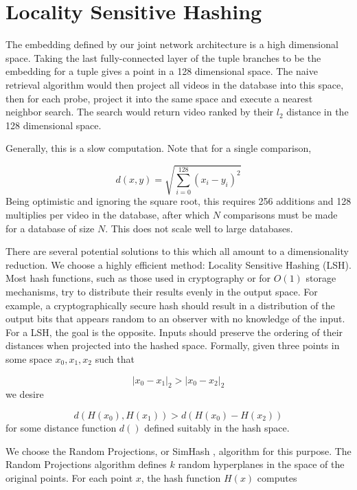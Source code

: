 \section{Locality Sensitive Hashing}\label{sec:hashing}

The embedding defined by our joint network architecture is a high dimensional space. Taking the last fully-connected layer of the tuple branches to be the embedding for a tuple gives a point in a 128 dimensional space. The naive retrieval algorithm would then project all videos in the database into this space, then for each probe, project it into the same space and execute a nearest neighbor search. The search would return video ranked by their $l_2$ distance in the 128 dimensional space.

Generally, this is a slow computation. Note that for a single comparison, 

\begin{equation}
    d(x, y) = \sqrt{\sum_{i=0}^{128} (x_i - y_i)^2}
\end{equation} 
Being optimistic and ignoring the square root, this requires 256 additions and 128 multiplies per video in the database, after which $N$ comparisons must be made for a database of size $N$. This does not scale well to large databases.

There are several potential solutions to this which all amount to a dimensionality reduction. We choose a highly efficient method: Locality Sensitive Hashing (LSH). Most hash functions, such as those used in cryptography or for $O(1)$ storage mechanisms, try to distribute their results evenly in the output space. For example, a cryptographically secure hash should result in a distribution of the output bits that appears random to an observer with no knowledge of the input. For a LSH, the goal is the opposite. Inputs should preserve the ordering of their distances when projected into the hashed space. Formally, given three points in some space $x_0, x_1, x_2$ such that 

\begin{equation}
|x_0 - x_1|_2 > |x_0 - x_2|_2
\end{equation}
we desire

\begin{equation}
d(H(x_0), H(x_1)) > d(H(x_0) - H(x_2))
\end{equation}
for some distance function $d()$ defined suitably in the hash space.

We choose the Random Projections, or SimHash \cite{charikar2002similarity}, algorithm for this purpose. The Random Projections algorithm defines $k$ random hyperplanes in the space of the original points. For each point $x$, the hash function $H(x)$ computes

